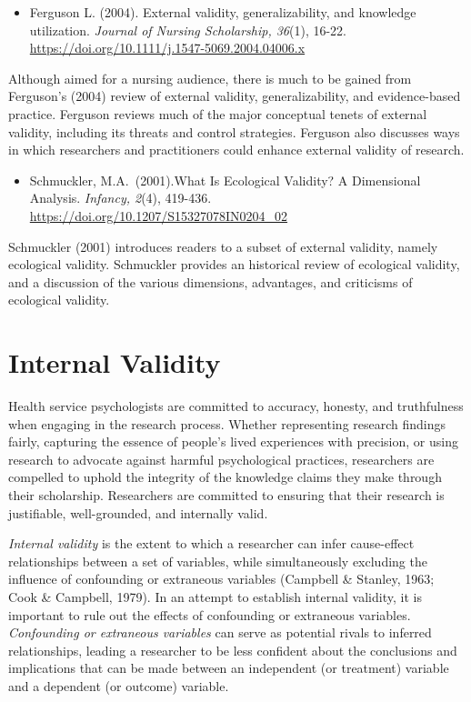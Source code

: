 \documentclass[
  11pt,
]{book}
\providecommand{\tightlist}{%
  \setlength{\itemsep}{0pt}\setlength{\parskip}{0pt}}
\begin{document}
\begin{itemize}
\tightlist
\item
  Ferguson L. (2004). External validity, generalizability, and knowledge utilization. \emph{Journal of Nursing Scholarship, 36}(1), 16-22. \url{https://doi.org/10.1111/j.1547-5069.2004.04006.x}
\end{itemize}

Although aimed for a nursing audience, there is much to be gained from Ferguson's (2004) review of external validity, generalizability, and evidence-based practice. Ferguson reviews much of the major conceptual tenets of external validity, including its threats and control strategies. Ferguson also discusses ways in which researchers and practitioners could enhance external validity of research.

\begin{itemize}
\tightlist
\item
  Schmuckler, M.A.~(2001).What Is Ecological Validity? A Dimensional Analysis. \emph{Infancy, 2}(4), 419-436. \url{https://doi.org/10.1207/S15327078IN0204_02}
\end{itemize}

Schmuckler (2001) introduces readers to a subset of external validity, namely ecological validity. Schmuckler provides an historical review of ecological validity, and a discussion of the various dimensions, advantages, and criticisms of ecological validity.

\hypertarget{internal-validity}{%
\section{Internal Validity}\label{internal-validity}}

Health service psychologists are committed to accuracy, honesty, and truthfulness when engaging in the research process. Whether representing research findings fairly, capturing the essence of people's lived experiences with precision, or using research to advocate against harmful psychological practices, researchers are compelled to uphold the integrity of the knowledge claims they make through their scholarship. Researchers are committed to ensuring that their research is justifiable, well-grounded, and internally valid.

\emph{Internal validity} is the extent to which a researcher can infer cause-effect relationships between a set of variables, while simultaneously excluding the influence of confounding or extraneous variables (Campbell \& Stanley, 1963; Cook \& Campbell, 1979). In an attempt to establish internal validity, it is important to rule out the effects of confounding or extraneous variables. \emph{Confounding or extraneous variables} can serve as potential rivals to inferred relationships, leading a researcher to be less confident about the conclusions and implications that can be made between an independent (or treatment) variable and a dependent (or outcome) variable.
\end{document}
